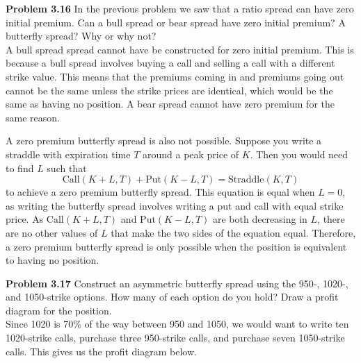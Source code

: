 \documentclass[12pt]{article}
\newcommand{\problem}[1]{\bigskip \noindent \textbf{Problem #1}}
\newcommand{\Call}{\text{Call}}
\newcommand{\Put}{\text{Put}}
\newcommand{\Straddle}{\text{Straddle}}
\theoremstyle{plain}
\begin{document}
\problem{3.16} In the previous problem we saw that a ratio spread can have zero initial premium. Can a bull spread or bear spread have zero initial premium? A butterfly spread? Why or why not?\\

A bull spread spread cannot have be constructed for zero initial premium. This is because a bull spread involves buying a call and selling a call with a different strike value. This means that the premiums coming in and premiums going out cannot be the same unless the strike prices are identical, which would be the same as having no position. A bear spread cannot have zero premium for the same reason.

A zero premium butterfly spread is also not possible. Suppose you write a straddle with expiration time $T$ around a peak price of $K$. Then you would need to find $L$ such that
\[
\Call(K+L,T) + \Put(K-L,T) = \Straddle(K,T)
\]
to achieve a zero premium butterfly spread. This equation is equal when $L = 0$, as writing the butterfly spread involves writing a put and call with equal strike price. As $\Call(K + L,T)$ and $\Put(K-L,T)$ are both decreasing in $L$, there are no other values of $L$ that make the two sides of the equation equal. Therefore, a zero premium butterfly spread is only possible when the position is equivalent to having no position.

\problem{3.17} Construct an asymmetric butterfly spread using the 950-, 1020-, and 1050-strike options. How many of each option do you hold? Draw a profit diagram for the position.\\

Since 1020 is 70\% of the way between 950 and 1050, we would want to write ten 1020-strike calls, purchase three 950-strike calls, and purchase seven 1050-strike calls. This gives us the profit diagram below.

\begin{center}
\end{center}
\end{document}
